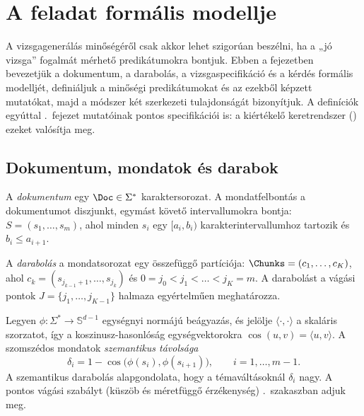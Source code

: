 \chapter{A feladat formális modellje}
\label{ch:formalizmus}

A vizsgagenerálás minőségéről csak akkor lehet szigorúan beszélni, ha a „jó vizsga” fogalmát mérhető
predikátumokra bontjuk. Ebben a fejezetben bevezetjük a dokumentum, a darabolás, a vizsgaspecifikáció
és a kérdés formális modelljét, definiáljuk a minőségi predikátumokat és az ezekből képzett mutatókat,
majd a módszer két szerkezeti tulajdonságát bizonyítjuk. A definíciók egyúttal \az{\ref{ch:kiertekeles}}.~fejezet mutatóinak pontos specifikációi is: a kiértékelő keretrendszer
() ezeket valósítja meg.

\section{Dokumentum, mondatok és darabok}

\begin{definicio}
A \emph{dokumentum} egy $\Doc\in\Sigma^{*}$ karaktersorozat. A mondatfelbontás a dokumentumot
diszjunkt, egymást követő intervallumokra bontja: $S=(s_1,\dots,s_m)$, ahol minden $s_i$ egy
$[a_i,b_i)$ karakterintervallumhoz tartozik és $b_i\le a_{i+1}$.
\end{definicio}

\begin{definicio}[Darabolás]
A \emph{darabolás} a mondatsorozat egy összefüggő partíciója: $\Chunks=(c_1,\dots,c_K)$, ahol
$c_k=(s_{j_{k-1}+1},\dots,s_{j_k})$ és $0=j_0<j_1<\dots<j_K=m$. A darabolást a vágási pontok
$J=\{j_1,\dots,j_{K-1}\}$ halmaza egyértelműen meghatározza.
\end{definicio}

Legyen $\phi:\Sigma^{*}\to\mathbb{S}^{d-1}$ egységnyi normájú beágyazás, és jelölje
$\langle\cdot,\cdot\rangle$ a skaláris szorzatot, így a koszinusz-hasonlóság egységvektorokra
$\cos(u,v)=\langle u,v\rangle$. A szomszédos mondatok \emph{szemantikus távolsága}
\begin{equation}
\delta_i = 1-\cos\bigl(\phi(s_i),\phi(s_{i+1})\bigr),\qquad i=1,\dots,m-1.
\label{eq:delta}
\end{equation}
A szemantikus darabolás alapgondolata, hogy a témaváltásoknál $\delta_i$ nagy. A pontos vágási
szabályt (küszöb és méretfüggő érzékenység) \az{\ref{sec:darabolas}}.~szakaszban adjuk meg.

